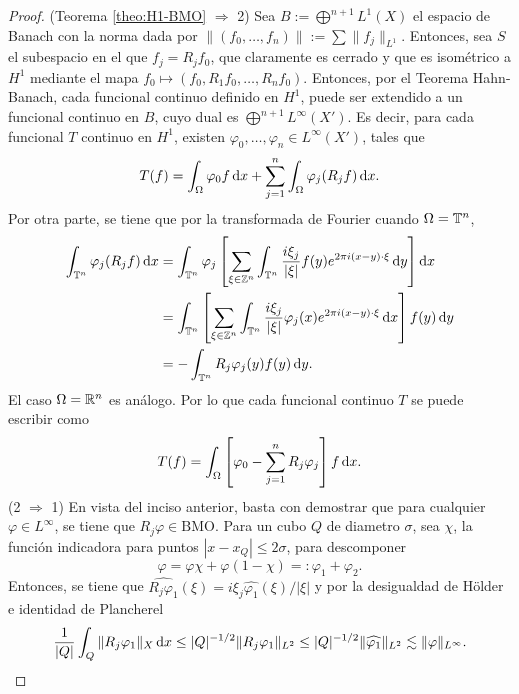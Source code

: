 \begin{proof}
	(Teorema \ref{theo:H1-BMO} $\Rightarrow$ 2) Sea $B:=\bigoplus^{n+1} L^1(X)$ el espacio de Banach con la norma dada por $\|(f_0,\ldots,f_n)\| := \sum\|f_j\|_{L^1}$. Entonces, sea $S$ el subespacio en el que $f_j = R_jf_0$, que claramente es cerrado y que es isométrico a $H^1$ mediante el mapa $f_0\mapsto(f_0, R_1f_0, \ldots, R_nf_0 )$. Entonces, por el Teorema Hahn-Banach, cada funcional continuo definido en $H^1$, puede ser extendido a un funcional continuo en $B$, cuyo dual es $\bigoplus^{n+1}L^\infty(X')$. Es decir, para cada funcional $T$ continuo en $H^1$, existen $\varphi_0,\ldots,\varphi_n\in L^\infty(X')$, tales que
	\begin{equation*}
		T(f)  = \int_{\Omega} {\varphi_0 f}\mathop{}\!\mathrm{d} x + \sum_{j=1}^n \int_{\Omega} \varphi_j(R_jf) \mathop{}\!\mathrm{d} x.
	\end{equation*}
	Por otra parte, se tiene que por la transformada de Fourier cuando $\Omega=\mathbb{T}^n$,
	\begin{align*}
		\int_{\mathbb{T}^n}\varphi_j(R_jf)\mathop{}\!\mathrm{d} x & = \int_{\mathbb{T}^n}\varphi_j \left[\sum_{\xi\in\mathbb{Z}^n}\int_{\mathbb{T}^n}  \frac{i\xi_j}{|\xi|} f(y)e^{2\pi i (x-y)\cdot\xi} \mathop{}\!\mathrm{d} y 
		\right]  \mathop{}\!\mathrm{d} x \\
		& = \int_{\mathbb{T}^n}  \left[\sum_{\xi\in\mathbb{Z}^n}\int_{\mathbb{T}^n}  \frac{i\xi_j}{|\xi|}  \varphi_j(x)e^{2\pi i (x-y)\cdot\xi} \mathop{}\!\mathrm{d} x 
		\right] f(y) \mathop{}\!\mathrm{d} y \\
		& = - \int_{\mathbb{T}^n}  R_j\varphi_j(y)f(y) \mathop{}\!\mathrm{d} y.
	\end{align*}
	El caso $\Omega=\mathbb{R}^n$ es análogo. Por lo que cada funcional continuo $T$ se puede escribir como 
	\begin{equation*}
		T(f) = \int_{\Omega}  \left[ \varphi_0 - \sum_{j=1}^n R_j\varphi_j
		\right] f \mathop{}\!\mathrm{d} x.
	\end{equation*}
	(2 $\Rightarrow$ 1) En vista del inciso anterior, basta con demostrar que para cualquier $\varphi\in L^\infty$, se tiene que $R_j\varphi \in \mathrm{BMO}$. Para un cubo $Q$ de diametro $\sigma$, sea $\chi$, la función indicadora para puntos $|x-x_Q|\leq2\sigma$, para descomponer 
	\begin{equation*}
		\varphi = \varphi\chi + \varphi(1-\chi) =: \varphi_1 + \varphi_2. 
	\end{equation*}
	Entonces, se tiene que $\widehat{R_j\varphi_1}(\xi) = i\xi_j\widehat{\varphi_1}(\xi)/|\xi|$ y por la desigualdad de Hölder e identidad de Plancherel
	\begin{equation}\label{eq:Rj-L-infty}
		\frac{1}{|Q|}\int_Q \|R_j\varphi_1\|_X\diff x \leq |Q|^{-1/2} \|R_j\varphi_1\|_{L^2} \leq|Q|^{-1/2} \|\widehat{\varphi_1}\|_{L^2}  \lesssim \|\varphi\|_{L^\infty}.

\end{equation}
\end{proof}
